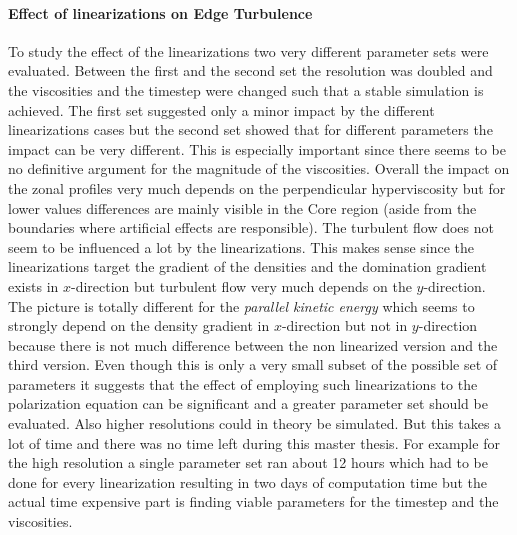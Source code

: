 \documentclass[master.tex]{subfiles}
\begin{document}
\paragraph{Effect of linearizations on Edge Turbulence}
To study the effect of the linearizations two very different parameter sets were evaluated. Between the first and the second set the resolution was doubled and the viscosities and the timestep were changed such that a stable simulation is achieved. The first set suggested only a minor impact by the different linearizations cases but the second set showed that for different parameters the impact can be very different. This is especially important since there seems to be no definitive argument for the magnitude of the viscosities. Overall the impact on the zonal profiles very much depends on the perpendicular hyperviscosity but for lower values differences are mainly visible in the Core region (aside from the boundaries where artificial effects are responsible). The turbulent flow does not seem to be influenced a lot by the linearizations. This makes sense since the linearizations target the gradient of the densities and the domination gradient exists in $x$-direction but turbulent flow very much depends on the $y$-direction. The picture is totally different for the \textit{parallel kinetic energy} which seems to strongly depend on the density gradient in $x$-direction but not in $y$-direction because there is not much difference between the non linearized version and the third version.\newline
Even though this is only a very small subset of the possible set of parameters it suggests that the effect of employing such linearizations to the polarization equation can be significant and a greater parameter set should be evaluated. Also higher resolutions could in theory be simulated. But this takes a lot of time and there was no time left during this master thesis. For example for the high resolution a single parameter set ran about 12 hours which had to be done for every linearization resulting in two days of computation time but the actual time expensive part is finding viable parameters for the timestep and the viscosities. 
\end{document}
